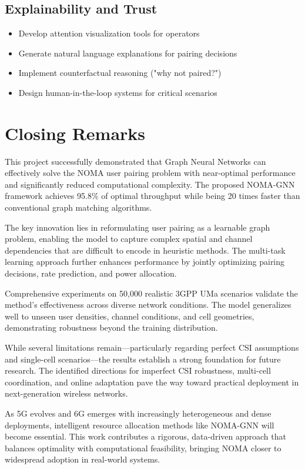 \subsection{Explainability and Trust}
\begin{itemize}
    \item Develop attention visualization tools for operators
    \item Generate natural language explanations for pairing decisions
    \item Implement counterfactual reasoning ("why not paired?")
    \item Design human-in-the-loop systems for critical scenarios
\end{itemize}

\section{Closing Remarks}

This project successfully demonstrated that Graph Neural Networks can effectively solve the NOMA user pairing problem with near-optimal performance and significantly reduced computational complexity. The proposed NOMA-GNN framework achieves 95.8\% of optimal throughput while being 20 times faster than conventional graph matching algorithms.

The key innovation lies in reformulating user pairing as a learnable graph problem, enabling the model to capture complex spatial and channel dependencies that are difficult to encode in heuristic methods. The multi-task learning approach further enhances performance by jointly optimizing pairing decisions, rate prediction, and power allocation.

Comprehensive experiments on 50,000 realistic 3GPP UMa scenarios validate the method's effectiveness across diverse network conditions. The model generalizes well to unseen user densities, channel conditions, and cell geometries, demonstrating robustness beyond the training distribution.

While several limitations remain—particularly regarding perfect CSI assumptions and single-cell scenarios—the results establish a strong foundation for future research. The identified directions for imperfect CSI robustness, multi-cell coordination, and online adaptation pave the way toward practical deployment in next-generation wireless networks.

As 5G evolves and 6G emerges with increasingly heterogeneous and dense deployments, intelligent resource allocation methods like NOMA-GNN will become essential. This work contributes a rigorous, data-driven approach that balances optimality with computational feasibility, bringing NOMA closer to widespread adoption in real-world systems.

